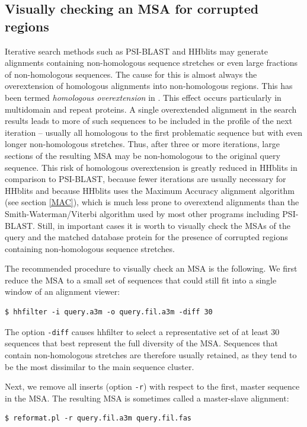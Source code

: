 \documentclass[11pt,a4paper]{article}
\begin{document}
\subsection{Visually checking an MSA for corrupted regions}

Iterative search methods such as PSI-BLAST and HHblits may generate alignments containing non-homologous sequence stretches or even large fractions of non-homologous sequences. The cause for this is almost always the overextension of homologous alignments into non-homologous regions. This has been termed \emph{homologous overextension} in \cite{Gonzalez:2010}. This effect occurs particularly in multidomain and repeat proteins. A single overextended alignment in the search results leads to more of such sequences to be included in the profile of the next iteration -- usually all homologous to the first problematic sequence but with even longer non-homologous stretches. Thus, after three or more iterations, large sections of the resulting MSA may be non-homologous to the original query sequence. This risk of homologous overextension is greatly reduced in HHblits in comparison to PSI-BLAST, because fewer iterations are usually necessary for HHblits and because HHblits uses the Maximum Accuracy alignment algorithm (see section \ref{MAC}), which is much less prone to overextend alignments than the Smith-Waterman/Viterbi algorithm used by most other programs including PSI-BLAST. Still, in important cases it is worth to visually check the MSAs of the query and the matched database protein for the presence of corrupted regions containing non-homologous sequence stretches. 

The recommended procedure to visually check an MSA is the following. We first reduce the MSA to a small set of sequences that could still fit into a single window of an alignment viewer:
\begin{verbatim}
$ hhfilter -i query.a3m -o query.fil.a3m -diff 30
\end{verbatim}
The option \verb`-diff` causes hhfilter to select a representative set of at least 30 sequences that best represent the full diversity of the MSA. Sequences that contain non-homologous stretches are therefore usually retained, as they tend to be the most dissimilar to the main sequence cluster. 

Next, we remove all inserts (option \verb`-r`) with respect to the first, master sequence in the MSA. The resulting MSA is sometimes called a master-slave alignment:
\begin{verbatim}
$ reformat.pl -r query.fil.a3m query.fil.fas
\end{verbatim}
\end{document}
